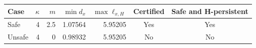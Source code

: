 \begin{tabular}{lrrrrcc}\toprule
Case & $\kappa$ & $m$ & $\min d_x$ & $\max\ell_{x,H}$ & Certified & Safe and H-persistent\\\midrule
Safe & 4 & 2.5 & 1.07564 & 5.95205 & Yes & Yes \\
Unsafe & 4 & 0 & 0.98932 & 5.95205 & No & No \\
\bottomrule\end{tabular}
